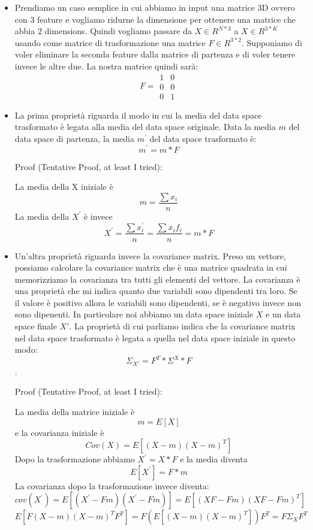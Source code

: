 \documentclass[14pt]{extreport}
\begin{document}
\begin{itemize}
	\item Prendiamo un caso semplice in cui abbiamo in input una matrice 3D ovvero con 3 feature e vogliamo ridurne la dimensione per ottenere una
	      matrice che abbia 2 dimensions. Quindi vogliamo passare da $X \in R^{N*3}$ a $X \in R^{3*K}$ usando come matrice di trasformazione una
	      matrice $F \in R^{3*2}$. Supponiamo di voler eliminare la seconda feature dalla matrice di partenza e di voler tenere invece le altre due.
	      La nostra matrice quindi sarà:
	      \begin{equation}
		      F = \begin{matrix}
			      1 & 0 \\
			      0 & 0 \\
			      0 & 1
		      \end{matrix}
	      \end{equation}
	\item La prima proprietà riguarda il modo in cui la media del data space trasformato è legata alla media del data space originale. Data la media
	      $m$ del data space di partenza, la media $m^{'}$ del data space trasformato è:
	      $$m^{'} = m * F$$

	      Proof (Tentative Proof, at least I tried):

	      La media della X iniziale è $$m = \frac{\sum x_i}{n}$$ La media della $X^{'}$ è invece $$X^{'} = \frac{\sum x_i^{'}}{n} = \frac{\sum x_i
	      f_i}{n} = m*F$$

	\item Un'altra proprietà riguarda invece la covariance matrix. Preso un vettore, possiamo calcolare la covariance matrix che è una matrice
	      quadrata in cui memorizziamo la covarianza tra tutti gli elementi del vettore. La covarianza è una proprietà che mi indica quanto due
	      variabili sono dipendenti tra loro. Se il valore è positivo allora le variabili sono dipendenti, se è negativo invece non sono dipenenti. In
	      particolare noi abbiamo un data space iniziale $X$ e un data space finale $X'$. La proprietà di cui parliamo indica che la covariance matrix
	      nel data space trasformato è legata a quella nel data space iniziale in questo modo:
	      $$\Sigma_{X'} = F^T*\Sigma^{X}*F$$.

	      Proof (Tentative Proof, at least I tried):

	      La media della matrice iniziale è $$m = E[X]$$ e la covarianza iniziale è $$Cov(X) = E[(X-m)(X-m)^T]$$ Dopo la trasformazione abbiamo $X^{'}
	      = X*F$ e la media diventa $$E[X^{'}] = F*m$$ La covarianza dopo la trasformazione invece diventa: $$cov(X^{'}) = E[(X^{'}-Fm)(X^{'}-Fm)] =
	      E[(XF-Fm)(XF-Fm)^T]$$
	      $$E[F(X-m)(X-m)^{T}F^{T}] = F(E[(X-m)(X-m)^{T}])F^{T} = F\Sigma_{X}F^{T}$$
\end{itemize}
\end{document}
